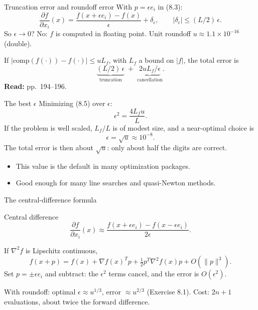 \documentclass[12pt,aspectratio=169]{beamer}
\newcommand{\readpp}[1]{{\color{red!80!black}\textbf{Read:} #1}}
\newcommand{\eps}{\epsilon}
\begin{document}
\begin{frame}{Truncation error and roundoff error}
  With $p=\eps e_i$ in (8.3):
  \begin{equation}
    \frac{\partial f}{\partial x_i}(x) = \frac{f(x+\eps e_i)-f(x)}{\eps} + \delta_\eps,
    \qquad |\delta_\eps|\le (L/2)\,\eps. \tag{8.4}
  \end{equation}
  So $\eps\to 0$? No: $f$ is computed in floating point. Unit roundoff $u\approx 1.1\times10^{-16}$ (double).

  If $|\mathrm{comp}(f(\cdot))-f(\cdot)|\le uL_f$, with $L_f$ a bound on $|f|$, the total error is
  \begin{equation}
    \underbrace{(L/2)\,\eps}_{\text{truncation}} \;+\; \underbrace{2uL_f/\eps}_{\text{cancellation}}. \tag{8.5}
  \end{equation}
  \readpp{pp.~194--196.}
\end{frame}

\begin{frame}{The best $\eps$}
  Minimizing (8.5) over $\eps$:
  \[
    \eps^2 = \frac{4L_f u}{L}.
  \]
  If the problem is well scaled, $L_f/L$ is of modest size, and a near-optimal choice is
  \begin{equation}
    \eps = \sqrt{u} \approx 10^{-8}. \tag{8.6}
  \end{equation}
  The total error is then about $\sqrt u$: \alert{only about half the digits are correct.}

  \begin{itemize}
    \item This value is the default in many optimization packages.
    \item Good enough for many line searches and quasi-Newton methods.
  \end{itemize}
\end{frame}

\begin{frame}{The central-difference formula}
  \begin{block}{Central difference}
    \vspace{-1ex}
    \begin{equation}
      \frac{\partial f}{\partial x_i}(x) \approx \frac{f(x+\eps e_i)-f(x-\eps e_i)}{2\eps}. \tag{8.7}
    \end{equation}
  \end{block}
  If $\nabla^2 f$ is Lipschitz continuous,
  \begin{equation}
    f(x+p) = f(x)+\nabla f(x)^Tp+\tfrac12 p^T\nabla^2 f(x)p + O(\|p\|^3). \tag{8.8}
  \end{equation}
  Set $p=\pm\eps e_i$ and subtract: the $\eps^2$ terms cancel, and the error is $O(\eps^2)$.

  With roundoff: optimal $\eps\approx u^{1/3}$, error $\approx u^{2/3}$ (Exercise 8.1).
  \alert{Cost: $2n+1$ evaluations}, about twice the forward difference.
\end{frame}
\end{document}

